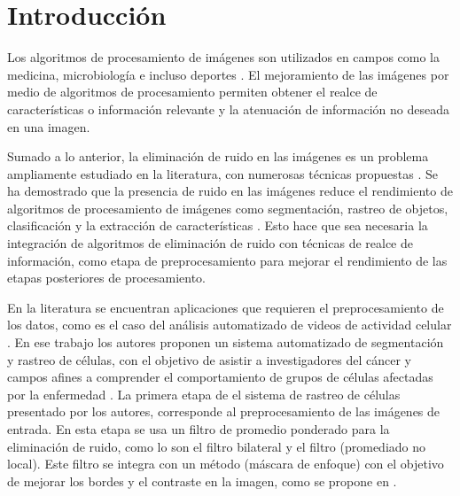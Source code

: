 
\chapter{Introducción}
\label{chp:intro}

Los algoritmos de procesamiento de im\'agenes son utilizados en campos como la medicina, microbiología e incluso deportes \cite{Aggarwal2011,	Ekin2003, Fils_BfilCells_2008}. El mejoramiento de las im\'agenes por medio de algoritmos de procesamiento permiten obtener el realce de características o información relevante y la atenuación de información no deseada en una imagen. 

Sumado a lo anterior, la eliminación de ruido en las imágenes es un problema ampliamente estudiado en la literatura, con numerosas técnicas propuestas \cite{edgpreservefilter}. Se ha demostrado que la presencia de ruido en las imágenes reduce el rendimiento de algoritmos de procesamiento de imágenes como segmentación, rastreo de objetos, clasificación y la extracción de características \cite{BF2014,IMPROVESEGMENTATIONBF,CONCAPAN2016}. Esto hace que sea necesaria la integración de algoritmos de eliminación de ruido con técnicas de realce de información, como etapa de preprocesamiento para mejorar el rendimiento de las etapas posteriores de procesamiento.  

En la literatura se encuentran aplicaciones que requieren el preprocesamiento de los datos, como es el caso del análisis automatizado de videos de actividad celular \cite{saenz2015deceived}. En ese trabajo los autores proponen un sistema automatizado de segmentación y rastreo de células, con el objetivo de asistir a investigadores del cáncer y campos afines a comprender el comportamiento de grupos de células afectadas por la enfermedad \cite{saenz2015deceived}. La primera etapa de el sistema de rastreo de células presentado por los autores, corresponde al preprocesamiento de las imágenes de entrada. En esta etapa se usa un filtro de promedio ponderado para la eliminación de ruido, como lo son el filtro bilateral y el filtro  (promediado no local). Este filtro se integra con un método  (máscara de enfoque) con el objetivo de mejorar los bordes y el contraste en la imagen, como se propone en \cite{calderon2015dewaff}. 

